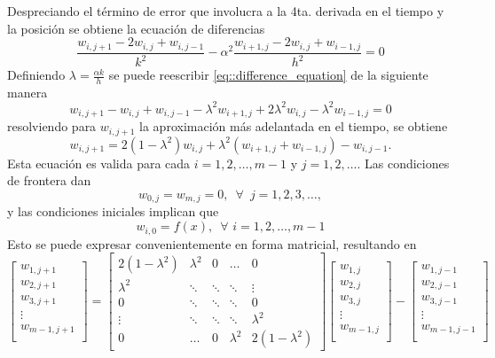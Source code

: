 \documentclass[a4paper]{article}
\begin{document}
Despreciando el término de error que involucra a la 4ta. derivada en el tiempo y la posición se obtiene la ecuación de diferencias
\begin{equation}\label{eq::difference_equation}
\frac{w_{i,j+1}-2w_{i,j}+w_{i,j-1}}{k^2}-\alpha^2\frac{w_{i+1,j}-2w_{i,j}+w_{i-1,j}}{h^2}=0
\end{equation}
Definiendo $\lambda=\frac{\alpha k}{h}$ se puede reescribir \ref{eq::difference_equation} de la siguiente manera
\begin{equation}\label{eq::difference_equation_2}
w_{i,j+1}-w_{i,j}+w_{i,j-1}-\lambda^2 w_{i+1,j}+2\lambda^2 w_{i,j}-\lambda^2 w_{i-1,j}=0
\end{equation}
resolviendo para $w_{i,j+1}$ la aproximación más adelantada en el tiempo, se obtiene
\begin{equation}\label{eq::difference_equation_3}
w_{i,j+1}=2(1-\lambda^2)w_{i,j}+\lambda^2(w_{i+1,j}+w_{i-1,j})-w_{i,j-1}.
\end{equation}
Esta ecuación es valida para cada $i=1,2,\hdots,m-1$ y $j=1,2,\hdots$. Las condiciones de frontera dan
\begin{equation}\label{eq::condition_1}
w_{0,j}=w_{m,j}=0,\,\,\,\forall\,\,\,j=1,2,3,\hdots,
\end{equation}
y las condiciones iniciales implican que
\begin{equation}
w_{i,0}=f(x), \,\,\, \forall\,\, i=1,2,\hdots,m-1
\end{equation}
Esto se puede expresar convenientemente en forma matricial, resultando en 
\begin{equation}\label{eq::matrix_difference_equation}
\begin{bmatrix}
w_{1,j+1}\\
w_{2,j+1}\\
w_{3,j+1}\\
\vdots\\
w_{m-1,j+1}\\
\end{bmatrix}
=
\begin{bmatrix}
2(1-\lambda^2) & \lambda^2 & 0 &\dots&0 \\
\lambda^2     &\ddots    & \ddots& \ddots&\vdots\\
0&\ddots&\ddots&\ddots&0\\
\vdots&\ddots&\ddots&\ddots&\lambda^2 \\
0&\dots&0&\lambda^2 &2(1-\lambda^2)
\end{bmatrix}
\begin{bmatrix}
w_{1,j}\\
w_{2,j}\\
w_{3,j}\\
\vdots\\
w_{m-1,j}\\
\end{bmatrix}-
\begin{bmatrix}
w_{1,j-1}\\
w_{2,j-1}\\
w_{3,j-1}\\
\vdots\\
w_{m-1,j-1}\\
\end{bmatrix}
\end{equation}
\end{document}
